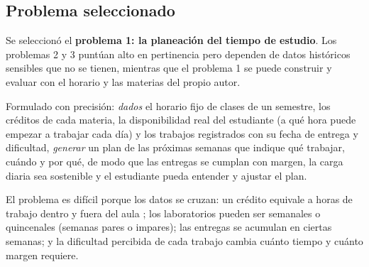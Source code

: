 \subsection{Problema seleccionado}

Se seleccionó el \textbf{problema 1: la planeación del tiempo de estudio}. Los problemas 2 y 3 puntúan alto en pertinencia pero dependen de datos históricos sensibles que no se tienen, mientras que el problema 1 se puede construir y evaluar con el horario y las materias del propio autor.

Formulado con precisión: \emph{dados} el horario fijo de clases de un semestre, los créditos de cada materia, la disponibilidad real del estudiante (a qué hora puede empezar a trabajar cada día) y los trabajos registrados con su fecha de entrega y dificultad, \emph{generar} un plan de las próximas semanas que indique qué trabajar, cuándo y por qué, de modo que las entregas se cumplan con margen, la carga diaria sea sostenible y el estudiante pueda entender y ajustar el plan.

El problema es difícil porque los datos se cruzan: un crédito equivale a horas de trabajo dentro y fuera del aula \parencite{MEN2019}; los laboratorios pueden ser semanales o quincenales (semanas pares o impares); las entregas se acumulan en ciertas semanas; y la dificultad percibida de cada trabajo cambia cuánto tiempo y cuánto margen requiere.
